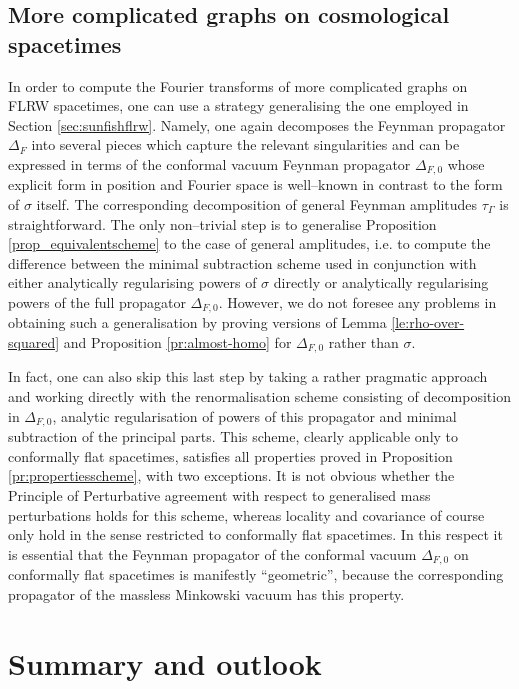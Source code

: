 \documentclass[a4paper,10pt,twoside]{article}
\numberwithin{equation}{section}
\newcounter{and}
\theoremstyle{plain}
\theoremstyle{definition}
\begin{document}
\subsection{More complicated graphs on cosmological spacetimes}

In order to compute the Fourier transforms of more complicated graphs on FLRW spacetimes, one can use a strategy generalising the one employed in Section \ref{sec:sunfishflrw}. Namely, one again decomposes the Feynman propagator $\Delta_F$ into several pieces which capture the relevant singularities and can be expressed in terms of the conformal vacuum Feynman propagator $\Delta_{F,0}$ whose explicit form in position and Fourier space is well--known in contrast to the form of $\sigma$ itself. The corresponding decomposition of general Feynman amplitudes $\tau_\Gamma$ is straightforward. The only non--trivial step is to generalise Proposition \ref{prop_equivalentscheme} to the case of general amplitudes, i.e. to compute the difference between the minimal subtraction scheme used in conjunction with either analytically regularising powers of $\sigma$ directly or analytically regularising powers of the full propagator $\Delta_{F,0}$. However, we do not foresee any problems in obtaining such a generalisation by proving versions of Lemma \ref{le:rho-over-squared} and Proposition \ref{pr:almost-homo} for $\Delta_{F,0}$ rather than $\sigma$.

In fact, one can also skip this last step by taking a rather pragmatic approach and working directly with the renormalisation scheme consisting of decomposition in $\Delta_{F,0}$, analytic regularisation of powers of this propagator and minimal subtraction of the principal parts. This scheme, clearly applicable only to conformally flat spacetimes, satisfies all properties proved in Proposition \ref{pr:propertiesscheme}, with two exceptions. It is not obvious whether the Principle of Perturbative agreement with respect to generalised mass perturbations holds for this scheme, whereas locality and covariance of course only hold in the sense restricted to conformally flat spacetimes. In this respect it is essential that the Feynman propagator of the conformal vacuum $\Delta_{F,0}$ on conformally flat spacetimes is manifestly ``geometric'', because the corresponding propagator of the massless Minkowski vacuum has this property.



\section{Summary and outlook} 
\end{document}
